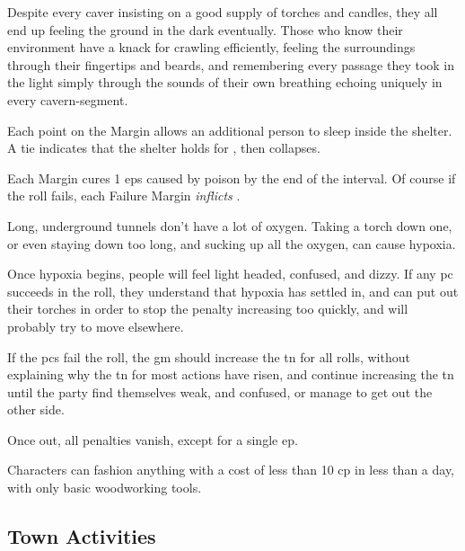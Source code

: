 \begin{multicols}{2}
Despite every caver insisting on a good supply of torches and candles, they all end up feeling the ground in the dark eventually.
Those who know their environment have a knack for crawling efficiently, feeling the surroundings through their fingertips and beards, and remembering every passage they took in the light simply through the sounds of their own breathing echoing uniquely in every cavern-segment.

Each point on the Margin allows an additional person to sleep inside the shelter.
A tie indicates that the shelter holds for , then collapses.

Each Margin cures 1 \glspl{ep} caused by poison by the end of the \gls{interval}.
Of course if the roll fails, each Failure Margin \emph{inflicts} .

Long, underground tunnels don't have a lot of oxygen.
Taking a torch down one, or even staying down too long, and sucking up all the oxygen, can cause hypoxia.

Once hypoxia begins, people will feel light headed, confused, and dizzy.
If any \gls{pc} succeeds in the roll, they understand that hypoxia has settled in, and can put out their torches in order to stop the penalty increasing too quickly, and will probably try to move elsewhere.

If the \glspl{pc} fail the roll, the \gls{gm} should increase the \gls{tn} for all rolls, without explaining why the \gls{tn} for most actions have risen, and continue increasing the \gls{tn} until the party find themselves weak, and confused, or manage to get out the other side.

Once out, all penalties vanish, except for a single \gls{ep}.

Characters can fashion anything with a cost of less than 10 \gls{cp} in less than a day, with only basic woodworking tools.

\subsection{Town Activities}


\end{multicols}
